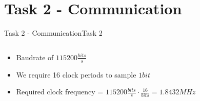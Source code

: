 
\section{Task 2 - Communication}

\setcounter{task}{1}

\begin{frame}[fragile]{Task 2 - Communication}{Task 2}
  \begin{solution}
    \begin{columns}
      \begin{column}{0.8\textwidth}
        \begin{itemize}
          \item Baudrate of $115200 \frac{bits}{s}$
          \item We require 16 clock periods to sample $1 bit$
          \item Required clock frequency = $115200 \frac{bits}{s} \cdot \frac{16}{bits} = 1.8432 MHz$
        \end{itemize}
      \end{column}
    \end{columns}
  \end{solution}
\end{frame}

